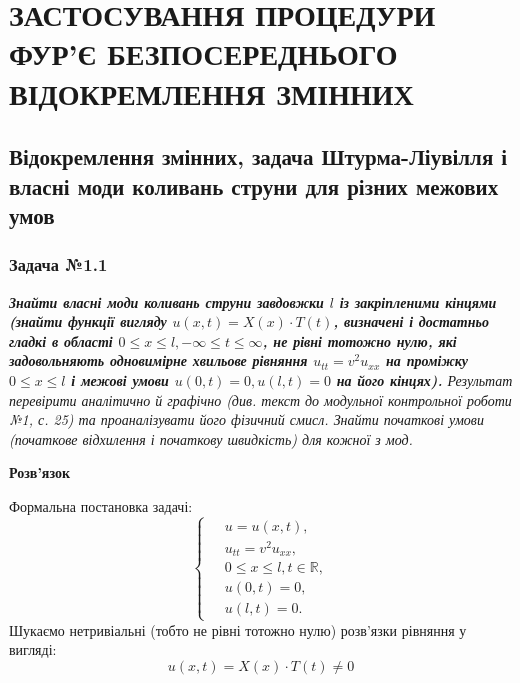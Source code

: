 \documentclass[a4paper, 14pt]{extreport}
\begin{document}
\tableofcontents
\setcounter{page}{2}

\chapter{ЗАСТОСУВАННЯ ПРОЦЕДУРИ ФУР’Є БЕЗПОСЕРЕДНЬОГО ВІДОКРЕМЛЕННЯ ЗМІННИХ}

\section{Відокремлення змінних, задача Штурма-Ліувілля і власні моди коливань струни для різних межових умов}

\subsection*{Задача №1.1}

\textit{\textbf{Знайти власні моди коливань струни завдовжки $l$ із закріпленими кінцями (знайти функції вигляду $u(x,t) = X(x) \cdot T(t)$, визначені і достатньо гладкі в області $0 \leq x \leq l, -\infty \leq t \leq \infty$, не рівні тотожно нулю, які задовольняють одновимірне хвильове рівняння $u_{tt} = v^2 u_{xx}$ на проміжку $0 \leq x \leq l$ і межові умови $u(0,t) = 0, u(l,t) = 0$ на його кінцях).} Результат перевірити аналітично й графічно (див. текст до модульної контрольної роботи №1, с. 25) та проаналізувати його фізичний смисл. Знайти початкові умови (початкове відхилення і початкову швидкість) для кожної з мод.}

\begin{center}
    \large{\textbf{Розв'язок}}
\end{center}

\noindent Формальна постановка задачі:
\begin{equation} \label{probcond}
    \left\{ \begin{aligned} %
        \;&u = u(x,t), \\  &u_{tt} = v^2 u_{xx}, \\ &0 \leq x \leq l, t \in \mathbb{R}, \\  &u(0,t) = 0, \\ &u(l,t) = 0. 
    \end{aligned} \right.
\end{equation}
Шукаємо нетривіальні (тобто не рівні тотожно нулю) розв'язки рівняння у вигляді:
\begin{equation} \label{subst}
    u(x,t) = X(x) \cdot T(t) \neq 0 
\end{equation}
\end{document}

